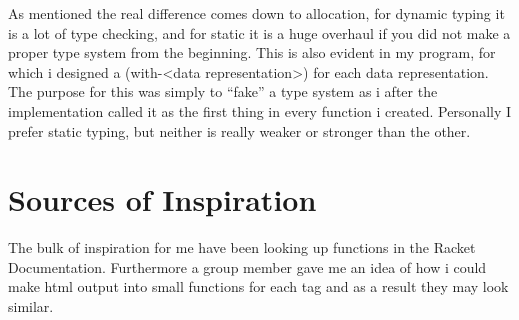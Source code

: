 \documentclass[11pt,a4paper,article,oneside]{memoir}
\begin{document}
As mentioned the real difference comes down to allocation, for dynamic typing it is a lot of type checking, and for static it is a huge overhaul if you did not make a proper type system from the beginning.
This is also evident in my program, for which i designed a (with-<data representation>) for each data representation.
The purpose for this was simply to ``fake'' a type system as i after the implementation called it as the first thing in every function i created.
Personally I prefer static typing, but neither is really weaker or stronger than the other.

\section{Sources of Inspiration}
The bulk of inspiration for me have been looking up functions in the Racket Documentation.
Furthermore a group member gave me an idea of how i could make html output into small functions for each tag and as a result they may look similar.


\newpage


%
%
\end{document}

